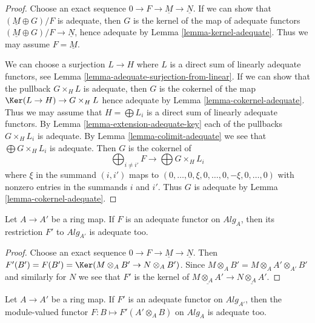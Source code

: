 \begin{proof}
Choose an exact sequence $0 \to F \to \underline{M} \to \underline{N}$.
If we can show that $(\underline{M} \oplus G)/F$ is adequate, then
$G$ is the kernel of the map of adequate functors
$(\underline{M} \oplus G)/F \to \underline{N}$, hence
adequate by
Lemma \ref{lemma-kernel-adequate}.
Thus we may assume $F = \underline{M}$.

\medskip\noindent
We can choose a surjection $L \to H$ where $L$ is a direct sum of
linearly adequate functors, see
Lemma \ref{lemma-adequate-surjection-from-linear}.
If we can show that the pullback $G \times_H L$ is adequate, then
$G$ is the cokernel of the map $\Ker(L \to H) \to G \times_H L$
hence adequate by
Lemma \ref{lemma-cokernel-adequate}.
Thus we may assume that $H = \bigoplus L_i$ is a direct sum of
linearly adequate functors. By
Lemma \ref{lemma-extension-adequate-key}
each of the pullbacks $G \times_H L_i$ is adequate. By
Lemma \ref{lemma-colimit-adequate}
we see that $\bigoplus G \times_H L_i$ is adequate.
Then $G$ is the cokernel of
$$
\bigoplus\nolimits_{i \not = i'} F \longrightarrow
\bigoplus G \times_H L_i
$$
where $\xi$ in the summand $(i, i')$ maps to
$(0, \ldots, 0, \xi, 0, \ldots, 0, -\xi, 0, \ldots, 0)$
with nonzero entries in the summands $i$ and $i'$.
Thus $G$ is adequate by
Lemma \ref{lemma-cokernel-adequate}.
\end{proof}

\begin{lemma}
\label{lemma-base-change-adequate}
Let $A \to A'$ be a ring map. If $F$ is an adequate functor on
$\textit{Alg}_A$, then its restriction $F'$ to
$\textit{Alg}_{A'}$ is adequate too.
\end{lemma}

\begin{proof}
Choose an exact sequence $0 \to F \to \underline{M} \to \underline{N}$.
Then $F'(B') = F(B') = \Ker(M \otimes_A B' \to N \otimes_A B')$.
Since $M \otimes_A B' = M \otimes_A A' \otimes_{A'} B'$ and similarly
for $N$ we see that $F'$ is the kernel of
$\underline{M \otimes_A A'} \to \underline{N \otimes_A A'}$.
\end{proof}

\begin{lemma}
\label{lemma-pushforward-adequate}
Let $A \to A'$ be a ring map. If $F'$ is an adequate functor on
$\textit{Alg}_{A'}$, then the module-valued functor
$F : B \mapsto F'(A' \otimes_A B)$ on $\textit{Alg}_A$ is adequate too.
\end{lemma}

